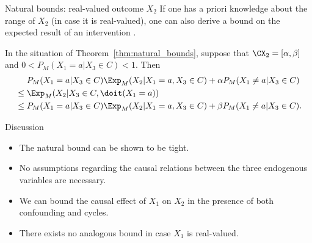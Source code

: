 \begin{frame}{Natural bounds: real-valued outcome $X_2$}
If one has a priori knowledge about the range of $X_2$ (in case it is real-valued), one can also derive a bound on the expected result of an intervention \cite{ManskiPepper2013}.
\begin{Cor}[\ref{cor:natural_bounds}]
  In the situation of Theorem~\ref{thm:natural_bounds}, suppose that $\CX_2 = [\alpha,\beta]$ and $0 < P_M(X_1=a|X_3\in C) < 1$. Then
  \begin{equation*}\begin{split}
    & P_M(X_1=a|X_3\in C) \Exp_M(X_2|X_1=a,X_3\in C) + \alpha P_M(X_1\ne a|X_3\in C) \\
    {}\le {}& \Exp_M(X_2|X_3\in C,\doit(X_1=a)) \\
    {}\le {}& P_M(X_1=a|X_3\in C) \Exp_M(X_2|X_1=a,X_3\in C) + \beta P_M(X_1\ne a|X_3\in C).
  \end{split}\end{equation*}
\end{Cor}
\end{frame}

\begin{frame}{Discussion}
  \begin{itemize}
    \item The natural bound can be shown to be tight. 
    \item No assumptions regarding the causal relations between the three endogenous variables are necessary.
    \item We can bound the causal effect of $X_1$ on $X_2$ in the presence of both confounding and cycles.
    \item There exists no analogous bound in case $X_1$ is real-valued.
  \end{itemize}
\end{frame}
